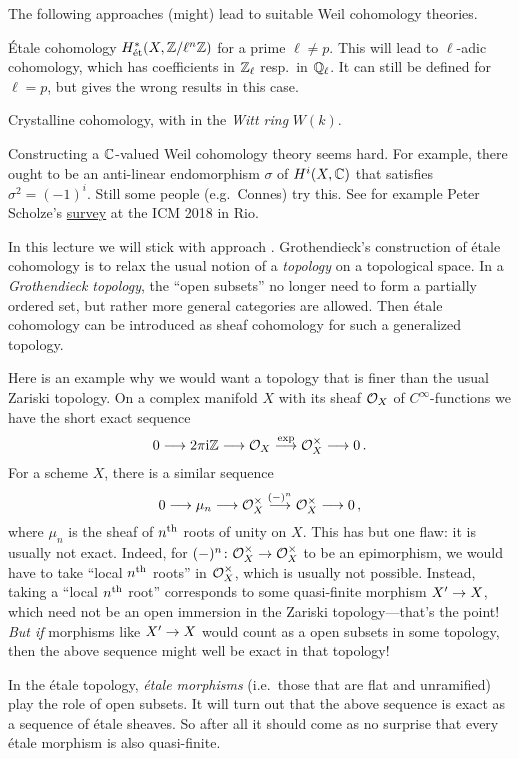 \documentclass[a4paper, 10pt, oneside, DIV=9, chapterprefix=true, numbers=enddot]{scrbook}
\begin{document}
	 The following approaches (might) lead to suitable Weil cohomology theories.
	\begin{alphanumerate}
		\item Étale cohomology $H_{\mathrm{\acute{e}t}}^*(X,\mathbb{Z}/\ell^n\mathbb{Z})$ for a prime $\ell\neq p$. This will lead to $\ell$-adic cohomology, which has coefficients in $\mathbb{Z}_\ell$ resp.\ in $\mathbb{Q}_\ell$. It can still be defined for $\ell=p$, but gives the wrong results in this case.
		\item Crystalline cohomology, with in the \emph{Witt ring} $W(k)$.
		\item Constructing a $\mathbb{C}$-valued Weil cohomology theory seems hard. For example, there ought to be an anti-linear endomorphism $\sigma$ of $H^i(X,\mathbb{C})$ that satisfies $\sigma^2=(-1)^i$. Still some people (e.g.\ Connes) try this. See for example Peter Scholze's \href{http://www.math.uni-bonn.de/people/scholze/Rio.pdf}{survey} at the ICM 2018 in Rio.
	\end{alphanumerate}
	In this lecture we will stick with approach . Grothendieck's construction of étale cohomology is to relax the usual notion of a \emph{topology} on a topological space. In a \emph{Grothendieck topology}, the \enquote{open subsets} no longer need to form a partially ordered set, but rather more general categories are allowed. Then étale cohomology can be introduced as sheaf cohomology for such a generalized topology.
	
	\begin{exm}
		Here is an example why we would want a topology that is finer than the usual Zariski topology. On a complex manifold $X$ with its sheaf $\mathcal{O}_X$ of $C^\infty$-functions we have the short exact sequence
		\begin{equation*}
			0\morphism 2\pi\mathrm{i}\IZ\morphism\Oo_X\morphism[\exp]\Oo_X^\times\morphism 0\,.
		\end{equation*}
		For a scheme $X$, there is a similar sequence
		\begin{equation*}
			0\morphism\mu_n\morphism\Oo_X^\times\morphism[(-)^n]\Oo_X^\times\morphism 0\,,
		\end{equation*}
		where $\mu_n$ is the sheaf of $n^{\text{th}}$ roots of unity on $X$. This has but one flaw: it is usually not exact. Indeed, for $(-)^n\colon \Oo_X^\times\morphism\Oo_X^\times$ to be an epimorphism, we would have to take \enquote{local $n^{\text{th}}$ roots} in $\mathcal{O}_X^\times$, which is usually not possible. Instead, taking a \enquote{local $n^{\text{th}}$ root} corresponds to some quasi-finite morphism $X'\morphism X$, which need not be an open immersion in the Zariski topology---that's the point! \emph{But if} morphisms like $X'\morphism X$ would count as a open subsets in some topology, then the above sequence might well be exact in that topology!
		
		In the étale topology, \emph{étale morphisms} (i.e.\ those that are flat and unramified) play the role of open subsets. It will turn out that the above sequence is exact as a sequence of étale sheaves. So after all it should come as no surprise that every étale morphism is also quasi-finite.
	\end{exm}
	
\end{document}
